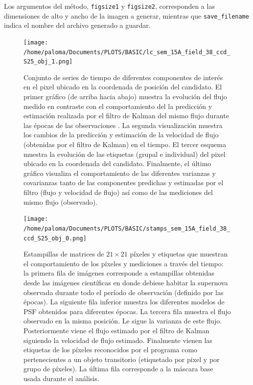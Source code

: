 \begin{itemize}
Los argumentos del m\'etodo, \texttt{figsize1} y \texttt{figsize2}, corresponden a las dimensiones de alto y ancho de la imagen a generar, mientras que \texttt{save\_filename} indica el nombre del archivo generado a guardar.  
\end{itemize}

\begin{figure}[h!]
\centering
\texttt{[image: /home/paloma/Documents/PLOTS/BASIC/lc\_sem\_15A\_field\_38\_ccd\_S25\_obj\_1.png]}
\caption{Conjunto de series de tiempo de diferentes componentes de inter\'es en el pixel ubicado en la coordenada de posici\'on del candidato. El primer gr\'afico (de arriba hacia abajo) muestra la evoluci\'on del flujo medido en contraste con el comportamiento del la predicci\'on y estimaci\'on realizada por el filtro de Kalman del mismo flujo durante las \'epocas de las observaciones . La segunda visualizaci\'on muestra los cambios de la predicci\'on y estimaci\'on de la velocidad de flujo (obtenidas por el filtro de Kalman) en el tiempo. El tercer esquema muestra la evoluci\'on de las etiquetas (grupal e individual) del pixel ubicado en la coordenada del candidato. Finalmente, el \'ultimo gr\'afico visualiza el comportamiento de las diferentes varianzas y covarianzas tanto de las componentes predichas y estimadas por el filtro (flujo y velocidad de flujo) as\'i como de las mediciones del mismo flujo (observado).}
\label{fig:lc_result}
\end{figure}

\begin{figure}[h!]
\centering
\texttt{[image: /home/paloma/Documents/PLOTS/BASIC/stamps\_sem\_15A\_field\_38\_ccd\_S25\_obj\_0.png]}
\caption{Estampillas de matrices de $21 \times 21$ p\'ixeles y etiquetas que muestran el comportamiento de los p\'ixeles y mediciones a trav\'es del tiempo: la primera fila de im\'agenes corresponde a estampillas obtenidas desde las im\'agenes cient\'ificas en donde debiese habitar la supernova observada durante todo el per\'iodo de observaci\'on (definido por las \'epocas). La siguiente fila inferior muestra los diferentes modelos de PSF obtenidos para diferentes \'epocas. La tercera fila muestra el flujo observado en la misma posici\'on. Le sigue la varianza de este flujo. Posteriormente viene el flujo estimado por el filtro de Kalman siguiendo la velocidad de flujo estimado. Finalmente vienen las etiquetas de los p\'ixeles reconocidos por el programa como pertenecientes a un objeto transitorio (etiquetado por pixel y por grupo de p\'ixeles). La \'ultima fila corresponde a la m\'ascara base usada durante el an\'alisis.}
\label{fig:stamps_result}
\end{figure}
\bigskip


